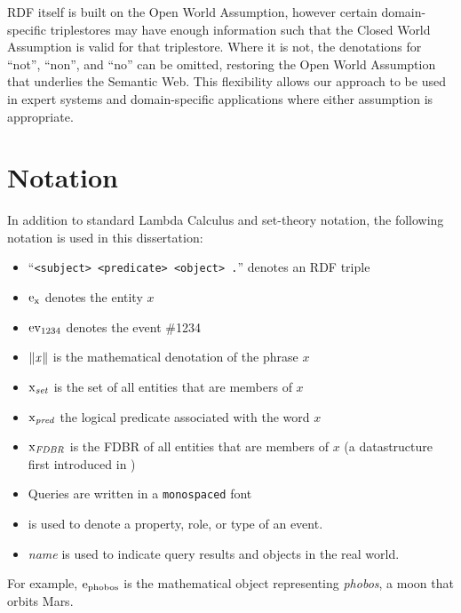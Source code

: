 \documentclass[../main.tex]{subfiles}
\begin{document}
\begin{refsection}
RDF itself is built on the Open World Assumption, however certain domain-specific triplestores may have enough information such that the Closed World Assumption is valid for that triplestore.  Where it is not, the denotations for ``not'', ``non'', and ``no'' can be omitted, restoring the Open World Assumption
that underlies the Semantic Web.  This flexibility allows our approach to be used in expert systems and domain-specific applications where either assumption is appropriate.

\section{Notation}

In addition to standard Lambda Calculus and set-theory notation, the following notation is used in this dissertation:
\begin{itemize}
    \item ``\texttt{<subject> <predicate> <object> .}'' denotes an RDF triple
    \item $\mathrm{e}_{\operatorname{x}}$ denotes the entity $x$
    \item $\operatorname{ev}_{1234}$ denotes the event \#1234
    \item $\lVert\textit{x\hspace{0.1em}}\rVert$ is the mathematical denotation of the phrase $x$
    \item $\operatorname{x}_{\operatorname{\mathit{set}}}$ is the set of all entities that are members of $x$
    \item $\operatorname{x}_{\operatorname{\mathit{pred}}}$ the logical predicate associated with the word $x$
    \item $\operatorname{x}_{\operatorname{\mathit{FDBR}}}$ is the FDBR of all entities that are members of $x$ (a datastructure first introduced in )
    \item Queries are written in a \texttt{monospaced} font
    \item {} is used to denote a property, role, or type of an event.
    \item \textit{name} is used to indicate query results and objects in the real world.
\end{itemize}
For example, $\mathrm{e}_{\operatorname{phobos}}$ is the mathematical object representing \textit{phobos}, a moon that orbits Mars.

\printbibliography[heading=subbibintoc]
\end{refsection}
\end{document}
